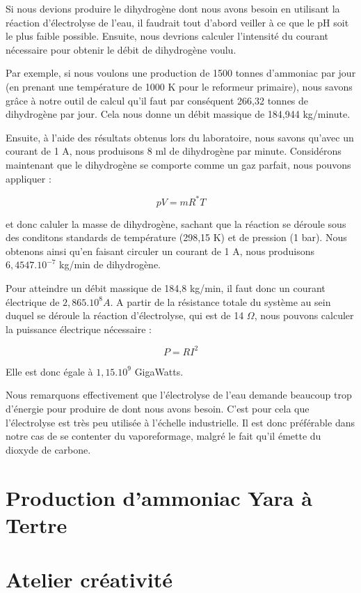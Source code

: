 \documentclass[a4paper, oneside, 12pt]{article}
\begin{document}
Si nous devions produire le dihydrogène dont nous avons besoin en utilisant la réaction d'électrolyse de l'eau, il faudrait tout d'abord veiller à ce que le pH soit le plus faible possible. Ensuite, nous devrions calculer l'intensité du courant nécessaire pour obtenir le débit de dihydrogène voulu.

Par exemple, si nous voulons une production de 1500 tonnes d'ammoniac par jour (en prenant une température de 1000 K pour le reformeur primaire), nous savons grâce à notre outil de calcul qu'il faut par conséquent 266,32 tonnes de dihydrogène par jour. Cela nous donne un débit massique de 184,944 kg/minute.

Ensuite, à l'aide des résultats obtenus lors du laboratoire, nous savons qu'avec un courant de 1 A, nous produisons 8 ml de dihydrogène par minute. Considérons maintenant que le dihydrogène se comporte comme un gaz parfait, nous pouvons appliquer :

\begin{equation*}
	pV = mR^{*}T
\end{equation*}

et donc caluler la masse de dihydrogène, sachant que la réaction se déroule sous des conditons standards de température (298,15 K) et de pression (1 bar). Nous obtenons ainsi qu'en faisant circuler un courant de 1 A, nous produisons $6,4547.10^{-7}$ kg/min de dihydrogène.

Pour atteindre un débit massique de 184,8 kg/min, il faut donc un courant électrique de $2,865.10^8 A$. A partir de la résistance totale du système au sein duquel se déroule la réaction d'électrolyse, qui est de 14 $\Omega$, nous pouvons calculer la puissance électrique nécessaire : 

\begin{equation*}
	P = RI^{2}
\end{equation*}

Elle est donc égale à $1,15.10^{9}$ GigaWatts.

Nous remarquons effectivement que l'électrolyse de l'eau demande beaucoup trop d'énergie pour produire de dont nous avons besoin. C'est pour cela que l'électrolyse est très peu utilisée à l'échelle industrielle. Il est donc préférable dans notre cas de se contenter du vaporeformage, malgré le fait qu'il émette du dioxyde de carbone.

\section{Production d'ammoniac Yara à Tertre}

\section{Atelier créativité}
\end{document}
